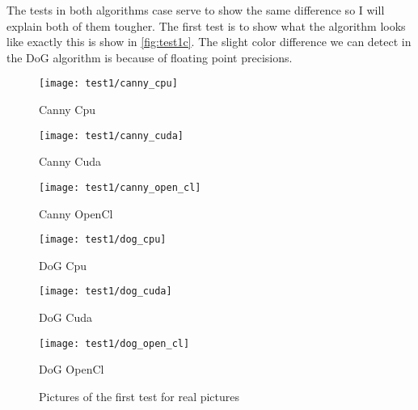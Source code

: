 \begin{table}[H]
\centering
{}
\caption{Test plans for the Real picture tester for \ac{DoG} algorithm}
\label{tab:real_pic_dog}
\end{table}

The tests in both algorithms case serve to show the same difference so I will explain both of them tougher. The first test is to show what the algorithm looks like exactly this is show in \autoref{fig:test1c}. The slight color difference we can detect in the \ac{DoG} algorithm is because of floating point precisions.


\begin{figure}[H]
\centering
\begin{minipage}[t]{.325\textwidth}
\centering
\texttt{[image: test1/canny\_cpu]}
\addtocounter{figure}{-1}
\captionsetup{labelformat=empty}
\caption[]{Canny Cpu}
\end{minipage}
\begin{minipage}[t]{.325\textwidth}
\centering
\texttt{[image: test1/canny\_cuda]}
\addtocounter{figure}{-1}
\captionsetup{labelformat=empty}
\caption[]{Canny Cuda}
\end{minipage}
\begin{minipage}[t]{.325\textwidth}
\centering
\texttt{[image: test1/canny\_open\_cl]}
\addtocounter{figure}{-1}
\captionsetup{labelformat=empty}
\caption[]{Canny OpenCl}
\end{minipage}
\begin{minipage}[t]{.325\textwidth}
\centering
\texttt{[image: test1/dog\_cpu]}
\addtocounter{figure}{-1}
\captionsetup{labelformat=empty}
\caption[]{DoG Cpu}
\end{minipage}
\begin{minipage}[t]{.325\textwidth}
\centering
\texttt{[image: test1/dog\_cuda]}
\addtocounter{figure}{-1}
\captionsetup{labelformat=empty}
\caption[]{DoG Cuda}
\end{minipage}
\begin{minipage}[t]{.325\textwidth}
\centering
\texttt{[image: test1/dog\_open\_cl]}
\addtocounter{figure}{-1}
\captionsetup{labelformat=empty}
\caption[]{DoG OpenCl}
\end{minipage}
\caption{Pictures of the first test for real pictures}
\label{fig:test1c}
\end{figure}


